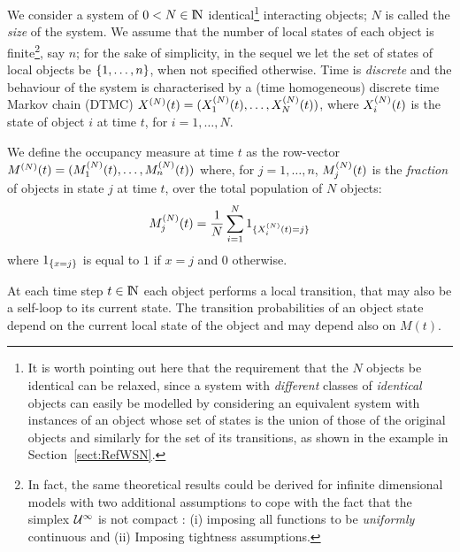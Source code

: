 \documentclass{amsart}
\begin{document}
We consider a system of $0<N \in \mathrm{I\!N}$ identical\footnote{It is worth
  pointing out here that the requirement that the $N$ 
  objects be identical 
  can be relaxed, since a system with {\em different} classes of {\em
    identical} objects can easily be modelled by considering an
  equivalent system with instances of an object whose set of states is
  the union of those of the original objects and similarly for the set
  of its transitions, as shown in the example in
  Section~\ref{sect:RefWSN}.} interacting objects; $N$ is called the
{\em size} of the system.  We assume that the number of local states
of each object is finite\footnote{In fact, the same theoretical
  results could be derived for infinite dimensional models with two
  additional assumptions to cope with the fact that the simplex
  $\mathcal{U}^{\infty}$ is not compact : (i) imposing all functions to be
  \emph{uniformly} continuous and (ii) Imposing tightness
  assumptions.}, say $n$; for the sake of simplicity, in the sequel we
let the set of states of local objects be $\{1,\ldots, n\}$, when
not specified otherwise.  Time is {\em discrete} and the behaviour of
the system is characterised by a (time homogeneous) discrete time
Markov chain (DTMC) $X^{(N)}(t)=(X_1^{(N)}(t), \ldots, X_N^{(N)}(t))$,
where $X_i^{(N)}(t)$ is the state of object $i$ at time $t$, for
$i=1,\ldots, N$.

We define the occupancy measure at time $t$ as the row-vector
$M^{(N)}(t)=(M_1^{(N)}(t), \ldots, M_n^{(N)}(t))$ where, for
$j=1,\ldots, n$, $M_j^{(N)}(t)$ is the {\em fraction} of objects in state
$j$ at time $t$, over the total population of $N$ objects:
\begin{align*}
  M_j^{(N)}(t) = \frac{1}{N}\sum_{i=1}^N 1_{\{X_i^{(N)}(t)=j\}}
\end{align*}
where $1_{\{x=j\}}$ is equal to $1$ if $x=j$ and $0$ otherwise.

At each time step $t \in \mathrm{I\!N}$ each object performs a local
transition, that may also be a self-loop to its current state.  The
transition probabilities of an object state depend on the current
local state of the object and may depend also on $M(t)$.
\end{document}
